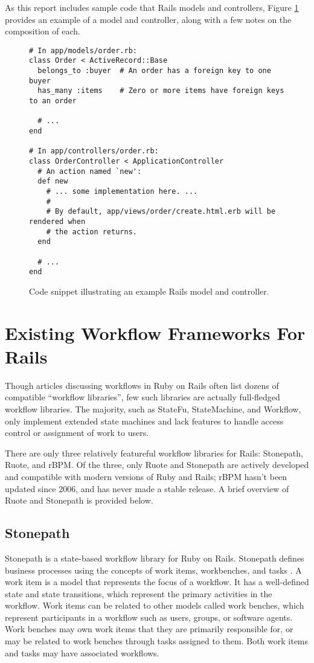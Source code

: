 \documentclass[document.tex]{subfiles}
\begin{document}
As this report includes sample code that Rails models and controllers, Figure \ref{fig:background-rails-code} provides an example of a model and controller, along with a few notes on the composition of each.

\begin{figure}[!ht]
  \begin{lstlisting}
# In app/models/order.rb:
class Order < ActiveRecord::Base
  belongs_to :buyer  # An order has a foreign key to one buyer
  has_many :items    # Zero or more items have foreign keys to an order

  # ...
end

# In app/controllers/order.rb:
class OrderController < ApplicationController
  # An action named `new':
  def new
    # ... some implementation here. ...
    #
    # By default, app/views/order/create.html.erb will be rendered when
    # the action returns.
  end

  # ...
end
  \end{lstlisting}
  \cprotect\caption{Code snippet illustrating an example Rails model and controller.}
  \label{fig:background-rails-code}
\end{figure}


\section {Existing Workflow Frameworks For Rails}
\label {sec:evaluating-existing-workflow-frameworks}

Though articles discussing workflows in Ruby on Rails often list dozens of compatible ``workflow libraries'', few such libraries are actually full-fledged workflow libraries. The majority, such as StateFu, StateMachine, and Workflow, only implement extended state machines and lack features to handle access control or assignment of work to users.

There are only three relatively featureful workflow libraries for Rails: Stonepath, Ruote, and rBPM. Of the three, only Ruote and Stonepath are actively developed and compatible with modern versions of Ruby and Rails; rBPM hasn't been updated since 2006, and has never made a stable release. A brief overview of Ruote and Stonepath is provided below.

\subsection {Stonepath}

Stonepath is a state-based workflow library for Ruby on Rails. Stonepath defines business processes using the concepts of work items, workbenches, and tasks \cite{stonepath}. A work item is a model that represents the focus of a workflow. It has a well-defined state and state transitions, which represent the primary activities in the workflow. Work items can be related to other models called work benches, which represent participants in a workflow such as users, groups, or software agents. Work benches may own work items that they are primarily responsible for, or may be related to work benches through tasks assigned to them. Both work items and tasks may have associated workflows.
\end{document}
